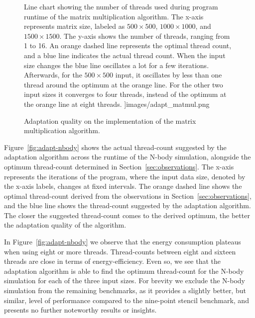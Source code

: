 \begin{figure}[t]
\begin{minipage}[c]{0.49\linewidth}
{            Line chart showing the number of threads used during program runtime of the matrix
            multiplication algorithm. The x-axis represents matrix size, labeled as $500 \times
            500$, $1000 \times 1000$, and $1500 \times 1500$. The y-axis shows the number of
            threads, ranging from 1 to 16. An orange dashed line represents the optimal thread
            count, and a blue line indicates the actual thread count. When the input size changes
            the blue line oscillates a lot for a few iterations. Afterwards, for the $500 \times 500$
            input, it oscillates by less than one thread around the optimum at the orange line. For
            the other two input sizes it converges to four threads, instead of the optimum at the
            orange line at eight threads.
        }]{images/adapt_matmul.png}
        \caption{Adaptation quality on the \sac{} implementation of the matrix multiplication
        algorithm.}
        \label{fig:adapt-matmul}
    \end{minipage}%
\end{figure}

Figure~\ref{fig:adapt-nbody} shows the actual thread-count suggested by the adaptation algorithm
across the runtime of the N-body simulation, alongside the optimum thread-count determined in
Section~\ref{sec:observations}. The x-axis represents the iterations of the program, where the input
data size, denoted by the x-axis labels, changes at fixed intervals. The orange dashed line shows
the optimal thread-count derived from the observations in Section~\ref{sec:observations}, and the
blue line shows the thread-count suggested by the adaptation algorithm. The closer the suggested
thread-count comes to the derived optimum, the better the adaptation quality of the algorithm.

In Figure~\ref{fig:adapt-nbody} we observe that the energy consumption plateaus when using eight or
more threads. Thread-counts between eight and sixteen threads are close in terms of
energy-efficiency. Even so, we see that the adaptation algorithm is able to find the optimum
thread-count for the N-body simulation for each of the three input sizes. For brevity we exclude the
N-body simulation from the remaining benchmarks, as it provides a slightly better, but similar,
level of performance compared to the nine-point stencil benchmark, and presents no further
noteworthy results or insights.

